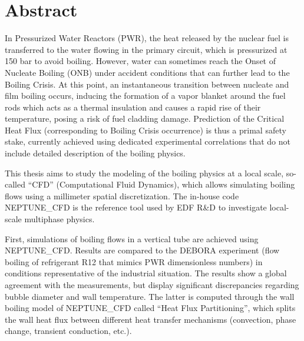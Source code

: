 


\begingroup
\let\clearpage\relax
\let\cleardoublepage\relax
\let\cleardoublepage\relax

\chapter*{Abstract}

In Pressurized Water Reactors (PWR), the heat released by the nuclear fuel is transferred to the water flowing in the primary circuit, which is pressurized at 150 bar to avoid boiling. However, water can sometimes reach the Onset of Nucleate Boiling (ONB) under accident conditions that can further lead to the Boiling Crisis. At this point, an instantaneous transition between nucleate and film boiling occurs, inducing the formation of a vapor blanket around the fuel rods which acts as a thermal insulation and  causes a rapid rise of their temperature, posing a risk of fuel cladding damage. Prediction of the Critical Heat Flux (corresponding to Boiling Crisis occurrence) is thus a primal safety stake, currently achieved using dedicated experimental correlations that do not include detailed description of the boiling physics.

\npar

This thesis aims to study the modeling of the boiling physics at a local scale, so-called  “CFD” (Computational Fluid Dynamics), which allows simulating boiling flows using a millimeter spatial discretization. The in-house code NEPTUNE\_CFD is the reference tool used by EDF R\&D to investigate local-scale multiphase physics.

\npar

First, simulations of boiling flows in a vertical tube are achieved using NEPTUNE\_CFD. Results are compared to the DEBORA experiment (flow boiling of refrigerant R12 that mimics PWR dimensionless numbers) in conditions representative of the industrial situation. The results show a global agreement with the measurements, but display significant discrepancies regarding bubble diameter and wall temperature. The latter is computed through the wall boiling model of NEPTUNE\_CFD called “Heat Flux Partitioning”, which splits the wall heat flux between different heat transfer mechanisms (convection, phase change, transient conduction, etc.).

